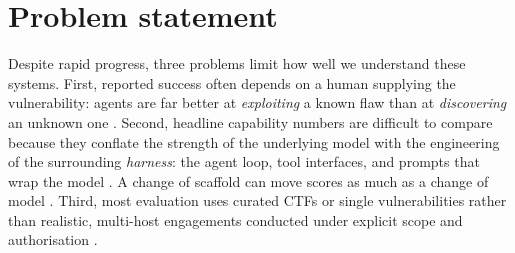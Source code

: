 \documentclass[12pt,oneside]{report}
\begin{document}
\section{Problem statement}
Despite rapid progress, three problems limit how well we understand these
systems. First, reported success often depends on a human supplying the
vulnerability: agents are far better at \emph{exploiting} a known flaw than at
\emph{discovering} an unknown one \citep{fang2024oneday}. Second, headline
capability numbers are difficult to compare because they conflate the strength
of the underlying model with the engineering of the surrounding
\emph{harness}: the agent loop, tool interfaces, and prompts that wrap the
model \citep{anthropic2024agents}. A change of scaffold can move scores as much
as a change of model \citep{offsec2025tuning}. Third,
most evaluation uses curated CTFs or single vulnerabilities rather than
realistic, multi-host engagements conducted under explicit scope and
authorisation \citep{zhang2024cybench, singer2025incalmo}.
\end{document}
